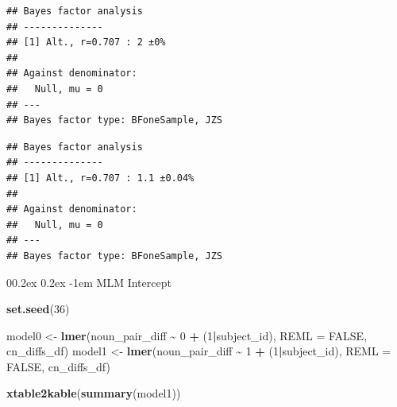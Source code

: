 \documentclass[
  doc,floatsintext]{apa6}
\makeatletter
\newenvironment{Shaded}{\begin{snugshade}}{\end{snugshade}}
\newcommand{\AttributeTok}[1]{\textcolor[rgb]{0.13,0.29,0.53}{#1}}
\newcommand{\CommentTok}[1]{\textcolor[rgb]{0.56,0.35,0.01}{\textit{#1}}}
\newcommand{\ConstantTok}[1]{\textcolor[rgb]{0.56,0.35,0.01}{#1}}
\newcommand{\DecValTok}[1]{\textcolor[rgb]{0.00,0.00,0.81}{#1}}
\newcommand{\FunctionTok}[1]{\textcolor[rgb]{0.13,0.29,0.53}{\textbf{#1}}}
\newcommand{\NormalTok}[1]{#1}
\newcommand{\OtherTok}[1]{\textcolor[rgb]{0.56,0.35,0.01}{#1}}
\newcommand{\SpecialCharTok}[1]{\textcolor[rgb]{0.81,0.36,0.00}{\textbf{#1}}}
\let\oldparagraph\paragraph
\renewcommand{\paragraph}{
    \@ifstar
      \xxxParagraphStar
      \xxxParagraphNoStar
  }
\newcommand{\xxxParagraphStar}[1]{\oldparagraph*{#1}\mbox{}}
\newcommand{\xxxParagraphNoStar}[1]{\oldparagraph{#1}\mbox{}}
\renewcommand{\paragraph}{\@startsection{paragraph}{4}{\parindent}%
  {0\baselineskip \@plus 0.2ex \@minus 0.2ex}%
  {-1em}%
  {\normalfont\normalsize\bfseries\itshape\typesectitle}}
\makeatother
\begin{document}
\begin{verbatim}
## Bayes factor analysis
## --------------
## [1] Alt., r=0.707 : 2 ±0%
## 
## Against denominator:
##   Null, mu = 0 
## ---
## Bayes factor type: BFoneSample, JZS
\end{verbatim}

\begin{Shaded}
\end{Shaded}

\begin{verbatim}
## Bayes factor analysis
## --------------
## [1] Alt., r=0.707 : 1.1 ±0.04%
## 
## Against denominator:
##   Null, mu = 0 
## ---
## Bayes factor type: BFoneSample, JZS
\end{verbatim}

\begin{Shaded}
\end{Shaded}

\paragraph{MLM Intercept}\label{mlm-intercept}

\begin{Shaded}
\begin{Highlighting}[]
\FunctionTok{set.seed}\NormalTok{(}\DecValTok{36}\NormalTok{)}

\NormalTok{model0 }\OtherTok{\textless{}{-}} \FunctionTok{lmer}\NormalTok{(noun\_pair\_diff }\SpecialCharTok{\textasciitilde{}} \DecValTok{0} \SpecialCharTok{+}\NormalTok{ (}\DecValTok{1}\SpecialCharTok{|}\NormalTok{subject\_id), }\AttributeTok{REML =} \ConstantTok{FALSE}\NormalTok{,}
\NormalTok{             cn\_diffs\_df)}
\NormalTok{model1 }\OtherTok{\textless{}{-}} \FunctionTok{lmer}\NormalTok{(noun\_pair\_diff }\SpecialCharTok{\textasciitilde{}} \DecValTok{1} \SpecialCharTok{+}\NormalTok{ (}\DecValTok{1}\SpecialCharTok{|}\NormalTok{subject\_id), }\AttributeTok{REML =} \ConstantTok{FALSE}\NormalTok{,}
\NormalTok{               cn\_diffs\_df)}

\FunctionTok{xtable2kable}\NormalTok{(}\FunctionTok{summary}\NormalTok{(model1))}
\end{Highlighting}
\end{Shaded}
\end{document}
